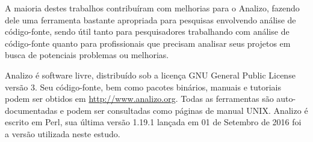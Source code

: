 A maioria destes trabalhos contribuíram com melhorias para o Analizo, fazendo
dele uma ferramenta bastante apropriada para pesquisas envolvendo análise de código-fonte,
sendo útil tanto para pesquisadores trabalhando com análise de código-fonte
quanto para profissionais que precisam analisar seus projetos em busca de
potenciais problemas ou melhorias.

Analizo é software livre, distribuído sob a licença GNU General Public License
versão 3. Seu código-fonte, bem como pacotes binários, manuais e tutoriais
podem ser obtidos em \url{http://www.analizo.org}. Todas as ferramentas são
auto-documentadas e podem ser consultadas como páginas de manual UNIX. Analizo
é escrito em Perl, sua última versão 1.19.1 lançada em 01 de Setembro de 2016
foi a versão utilizada neste estudo.

